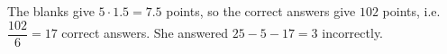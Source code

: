The blanks give $5\cdot1.5=7.5$ points, so the correct answers give $102$ points, i.e. $\dfrac{102}{6}=17$ correct answers. She answered $25-5-17=\boxed{3}$ incorrectly.

